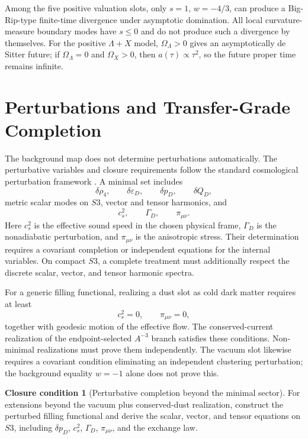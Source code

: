 \documentclass[11pt,a4paper]{article}
\def\Sthree{S3}%
\numberwithin{equation}{section}
\theoremstyle{definition}
\newtheorem{closurecondition}[criterion]{Closure condition}
\theoremstyle{plain}
\theoremstyle{remark}
\newcommand{\Sthree}{S^3}
\newcommand{\rhoFour}{\rho_4}
\newcommand{\epsD}{\varepsilon_D}
\newcommand{\pD}{p_D}
\newcommand{\QD}{Q_D}
\begin{document}
Among the five positive valuation slots, only \(s=1\), \(w=-4/3\), can produce a Big-Rip-type finite-time divergence under asymptotic domination. All local curvature-measure boundary modes have \(s\le0\) and do not produce such a divergence by themselves. For the positive \(\Lambda+X\) model, \(\Omega_\Lambda>0\) gives an asymptotically de Sitter future; if \(\Omega_\Lambda=0\) and \(\Omega_X>0\), then \(a(\tau)\propto \tau^2\), so the future proper time remains infinite.

\section{Perturbations and Transfer-Grade Completion}
The background map does not determine perturbations automatically. The perturbative variables and closure requirements follow the standard cosmological perturbation framework \cite{KodamaSasaki1984,HalliwellHawking1985,MukhanovFeldmanBrandenberger1992,MalikWands2009}. A minimal set includes
\begin{equation}
\delta\rhoFour,
\qquad
\delta\epsD,
\qquad
\delta\pD,
\qquad
\delta\QD,
\end{equation}
metric scalar modes on \(\Sthree\), vector and tensor harmonics, and
\begin{equation}
c_s^2,
\qquad
\Gamma_D,
\qquad
\pi_{\mu\nu}.
\end{equation}
Here \(c_s^2\) is the effective sound speed in the chosen physical frame, \(\Gamma_D\) is the nonadiabatic perturbation, and \(\pi_{\mu\nu}\) is the anisotropic stress. Their determination requires a covariant completion or independent equations for the internal variables. On compact \(\Sthree\), a complete treatment must additionally respect the discrete scalar, vector, and tensor harmonic spectra.

For a generic filling functional, realizing a dust slot as cold dark matter requires at least
\begin{equation}
c_s^2=0,
\qquad
\pi_{\mu\nu}=0,
\end{equation}
together with geodesic motion of the effective flow. The conserved-current realization of the endpoint-selected \(A^{-3}\) branch satisfies these conditions. Non-minimal realizations must prove them independently. The vacuum slot likewise requires a covariant condition eliminating an independent clustering perturbation; the background equality \(w=-1\) alone does not prove this.

\begin{closurecondition}[Perturbative completion beyond the minimal sector]
For extensions beyond the vacuum plus conserved-dust realization, construct the perturbed filling functional and derive the scalar, vector, and tensor equations on \(\Sthree\), including \(\delta\pD\), \(c_s^2\), \(\Gamma_D\), \(\pi_{\mu\nu}\), and the exchange law.
\end{closurecondition}
\end{document}

